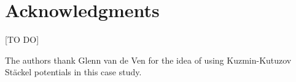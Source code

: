 \section{Acknowledgments}

[TO DO]

The authors thank Glenn van de Ven for the idea of using Kuzmin-Kutuzov St\"{a}ckel potentials in this case study.